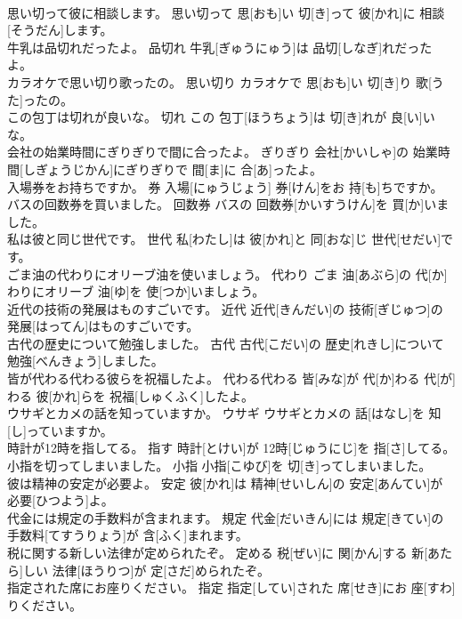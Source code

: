\documentclass[8pt]{extreport}
\begin{document}
\begin{CJK}{UTF8}{min}
\\	思い切って彼に相談します。	思い切って	思[おも]い 切[き]って 彼[かれ]に 相談[そうだん]します。	
\\	牛乳は品切れだったよ。	品切れ	牛乳[ぎゅうにゅう]は 品切[しなぎ]れだったよ。	
\\	カラオケで思い切り歌ったの。	思い切り	カラオケで 思[おも]い 切[き]り 歌[うた]ったの。	
\\	この包丁は切れが良いな。	切れ	この 包丁[ほうちょう]は 切[き]れが 良[い]いな。	
\\	会社の始業時間にぎりぎりで間に合ったよ。	ぎりぎり	会社[かいしゃ]の 始業時間[しぎょうじかん]にぎりぎりで 間[ま]に 合[あ]ったよ。	
\\	入場券をお持ちですか。	券	入場[にゅうじょう] 券[けん]をお 持[も]ちですか。	
\\	バスの回数券を買いました。	回数券	バスの 回数券[かいすうけん]を 買[か]いました。	
\\	私は彼と同じ世代です。	世代	私[わたし]は 彼[かれ]と 同[おな]じ 世代[せだい]です。	
\\	ごま油の代わりにオリーブ油を使いましょう。	代わり	ごま 油[あぶら]の 代[か]わりにオリーブ 油[ゆ]を 使[つか]いましょう。	
\\	近代の技術の発展はものすごいです。	近代	近代[きんだい]の 技術[ぎじゅつ]の 発展[はってん]はものすごいです。	
\\	古代の歴史について勉強しました。	古代	古代[こだい]の 歴史[れきし]について 勉強[べんきょう]しました。	
\\	皆が代わる代わる彼らを祝福したよ。	代わる代わる	皆[みな]が 代[か]わる 代[が]わる 彼[かれ]らを 祝福[しゅくふく]したよ。	
\\	ウサギとカメの話を知っていますか。	ウサギ	ウサギとカメの 話[はなし]を 知[し]っていますか。	
\\	時計が12時を指してる。	指す	時計[とけい]が 12時[じゅうにじ]を 指[さ]してる。	
\\	小指を切ってしまいました。	小指	小指[こゆび]を 切[き]ってしまいました。	
\\	彼は精神の安定が必要よ。	安定	彼[かれ]は 精神[せいしん]の 安定[あんてい]が 必要[ひつよう]よ。	
\\	代金には規定の手数料が含まれます。	規定	代金[だいきん]には 規定[きてい]の 手数料[てすうりょう]が 含[ふく]まれます。	
\\	税に関する新しい法律が定められたぞ。	定める	税[ぜい]に 関[かん]する 新[あたら]しい 法律[ほうりつ]が 定[さだ]められたぞ。	
\\	指定された席にお座りください。	指定	指定[してい]された 席[せき]にお 座[すわ]りください。	

\end{CJK}
\end{document}
